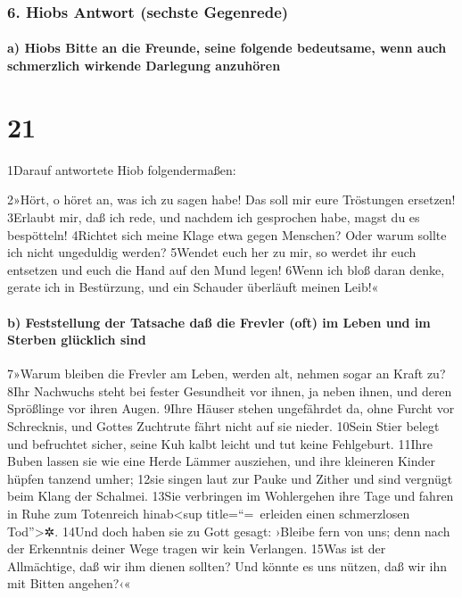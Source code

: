 \hypertarget{hiobs-antwort-sechste-gegenrede}{%
\subsubsection{6. Hiobs Antwort (sechste
Gegenrede)}\label{hiobs-antwort-sechste-gegenrede}}

\hypertarget{a-hiobs-bitte-an-die-freunde-seine-folgende-bedeutsame-wenn-auch-schmerzlich-wirkende-darlegung-anzuhuxf6ren}{%
\paragraph{a) Hiobs Bitte an die Freunde, seine folgende bedeutsame,
wenn auch schmerzlich wirkende Darlegung
anzuhören}\label{a-hiobs-bitte-an-die-freunde-seine-folgende-bedeutsame-wenn-auch-schmerzlich-wirkende-darlegung-anzuhuxf6ren}}

\hypertarget{section-20}{%
\section{21}\label{section-20}}

1Darauf antwortete Hiob folgendermaßen:

2»Hört, o höret an, was ich zu sagen habe! Das soll mir eure Tröstungen
ersetzen! 3Erlaubt mir, daß ich rede, und nachdem ich gesprochen habe,
magst du es bespötteln! 4Richtet sich meine Klage etwa gegen Menschen?
Oder warum sollte ich nicht ungeduldig werden? 5Wendet euch her zu mir,
so werdet ihr euch entsetzen und euch die Hand auf den Mund legen! 6Wenn
ich bloß daran denke, gerate ich in Bestürzung, und ein Schauder
überläuft meinen Leib!«

\hypertarget{b-feststellung-der-tatsache-dauxdf-die-frevler-oft-im-leben-und-im-sterben-gluxfccklich-sind}{%
\paragraph{b) Feststellung der Tatsache daß die Frevler (oft) im Leben
und im Sterben glücklich
sind}\label{b-feststellung-der-tatsache-dauxdf-die-frevler-oft-im-leben-und-im-sterben-gluxfccklich-sind}}

7»Warum bleiben die Frevler am Leben, werden alt, nehmen sogar an Kraft
zu? 8Ihr Nachwuchs steht bei fester Gesundheit vor ihnen, ja neben
ihnen, und deren Sprößlinge vor ihren Augen. 9Ihre Häuser stehen
ungefährdet da, ohne Furcht vor Schrecknis, und Gottes Zuchtrute fährt
nicht auf sie nieder. 10Sein Stier belegt und befruchtet sicher, seine
Kuh kalbt leicht und tut keine Fehlgeburt. 11Ihre Buben lassen sie wie
eine Herde Lämmer ausziehen, und ihre kleineren Kinder hüpfen tanzend
umher; 12sie singen laut zur Pauke und Zither und sind vergnügt beim
Klang der Schalmei. 13Sie verbringen im Wohlergehen ihre Tage und fahren
in Ruhe zum Totenreich hinab\textless sup title=``=~erleiden einen
schmerzlosen Tod''\textgreater✲. 14Und doch haben sie zu Gott gesagt:
›Bleibe fern von uns; denn nach der Erkenntnis deiner Wege tragen wir
kein Verlangen. 15Was ist der Allmächtige, daß wir ihm dienen sollten?
Und könnte es uns nützen, daß wir ihn mit Bitten angehen?‹«

